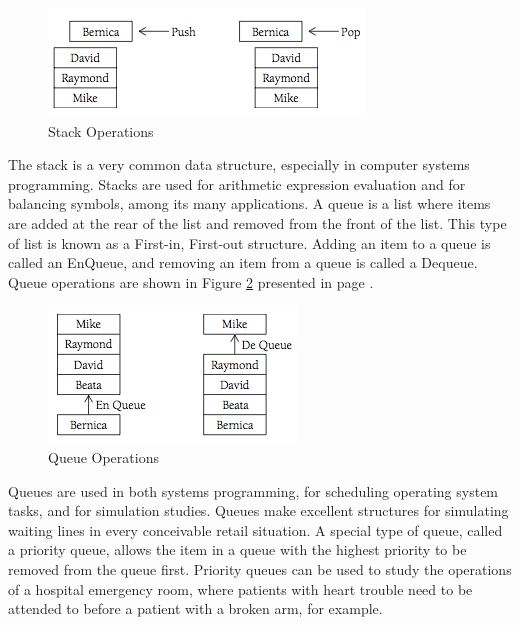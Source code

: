 \documentclass[12pt,a4paper,final,twoside,titlepage]{book}
\begin{document}
\begin{figure}
\begin{center}
\includegraphics[scale=0.75]{StackOperations}
\end{center}
\caption{Stack Operations}
\label{StackOperations}
\end{figure}
The stack is a very common data structure, especially in computer systems programming. Stacks are used for arithmetic expression evaluation and for balancing symbols, among its many applications.
A queue is a list where items are added at the rear of the list and removed from the front of the list. This type of list is known as a First-in, First-out structure. Adding an item to a queue is called an EnQueue, and removing an item from a queue is called a Dequeue. Queue operations are shown in Figure \ref{QueueOperations} presented in page \pageref{QueueOperations}.
\begin{figure}
\begin{center}
\includegraphics[scale=0.75]{QueueOperations}
\end{center}
\caption{Queue Operations}
\label{QueueOperations}
\end{figure}
Queues are used in both systems programming, for scheduling operating system tasks, and for simulation studies. Queues make excellent structures for simulating waiting lines in every conceivable retail situation. A special type of queue, called a priority queue, allows the item in a queue with the highest priority to be removed from the queue first. Priority queues can be used to study the operations of a hospital emergency room, where patients with heart trouble need to be attended to before a patient with a broken arm, for example.
\end{document}
